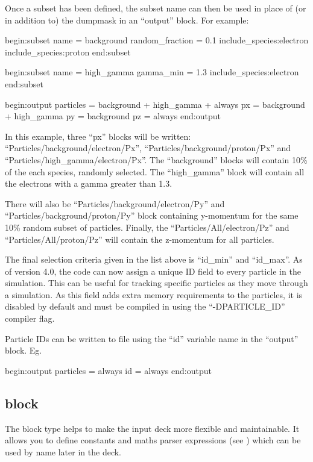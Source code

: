 Once a subset has been defined, the subset name can then be used in place of
(or in addition to) the dumpmask in an ``output'' block. For example:
{\samepage
\begin{boxverbatim}
begin:subset
   name = background
   random_fraction = 0.1
   include_species:electron
   include_species:proton
end:subset

begin:subset
   name = high_gamma
   gamma_min = 1.3
   include_species:electron
end:subset

begin:output
   particles = background + high_gamma + always
   px = background + high_gamma
   py = background
   pz = always
end:output
\end{boxverbatim}
}

In this example, three ``px'' blocks will be written:
``Particles/background/electron/Px'', ``Particles/background/proton/Px''
and ``Particles/high\_gamma/electron/Px''.
The ``background'' blocks will contain 10\% of the each species, randomly
selected.
The ``high\_gamma'' block will contain all the electrons with a gamma
greater than 1.3.

There will also be ``Particles/background/electron/Py'' and
``Particles/background/proton/Py'' block containing y-momentum for the same
10\% random subset of particles.
Finally, the ``Particles/All/electron/Pz'' and ``Particles/All/proton/Pz'' will
contain the z-momentum for all particles.

The final selection criteria given in the list above is ``id\_min'' and
``id\_max''. As of {\EPOCH} version 4.0, the code can now assign a unique
ID field to every particle in the simulation. This can be useful for
tracking specific particles as they move through a simulation. As this
field adds extra memory requirements to the particles, it is disabled by
default and must be compiled in using the ``-DPARTICLE\_ID'' compiler flag.

Particle IDs can be written to file using the ``id'' variable name in
the ``output'' block.  Eg.
\begin{boxverbatim}
begin:output
   particles = always
   id = always
end:output
\end{boxverbatim}


\subsection{ block}
\label{sec:constant_block}

The  block type helps to make the input deck more flexible
and maintainable. It allows you to define constants and maths parser
expressions (see ) which can be used by name later in the
deck.\\

